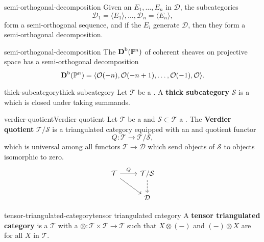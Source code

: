 \begin{example}{semi-orthogonal-decomposition}
    Given an  $E_1, \ldots, E_n$ in $\mathcal{D}$, the subcategories
    \[ \mathcal{D}_1 = \langle E_1 \rangle, \ldots, \mathcal{D}_n = \langle E_n \rangle , \]
    form a semi-orthogonal sequence, and if the $E_i$ generate $\mathcal{D}$, then they form a semi-orthogonal decomposition.
\end{example}

\begin{example}{semi-orthogonal-decomposition}
    The  $\textbf{D}^\textup{b}(\mathbb{P}^n)$ of coherent sheaves on projective space has a semi-orthogonal decomposition
    \[ \textbf{D}^\textup{b}(\mathbb{P}^n) = \langle \mathcal{O}(-n), \mathcal{O}(-n + 1), \ldots, \mathcal{O}(-1), \mathcal{O} \rangle . \]
\end{example}

\begin{topic}{thick-subcategory}{thick subcategory}
    Let $\mathcal{T}$ be a . A \textbf{thick subcategory} $\mathcal{S}$ is a   which is closed under taking summands.
\end{topic}

\begin{topic}{verdier-quotient}{Verdier quotient}
    Let $\mathcal{T}$ be a  and $\mathcal{S} \subset \mathcal{T}$ a . The \textbf{Verdier quotient} $\mathcal{T}/\mathcal{S}$ is a triangulated category equipped with an  and  quotient functor
    \[ Q : \mathcal{T} \to \mathcal{T}/\mathcal{S} , \]
    which is universal among all functors $\mathcal{T} \to \mathcal{D}$ which send objects of $\mathcal{S}$ to objects isomorphic to zero.
    \[ \begin{tikzcd} \mathcal{T} \arrow{r}{Q} \arrow{rd} & \mathcal{T} / \mathcal{S} \arrow[dashed]{d} \\ & \mathcal{D} \end{tikzcd} \]
\end{topic}

\begin{topic}{tensor-triangulated-category}{tensor triangulated category}
    A \textbf{tensor triangulated category} is a  $\mathcal{T}$ with a  $\otimes : \mathcal{T} \times \mathcal{T} \to \mathcal{T}$ such that $X \otimes (-)$ and $(-) \otimes X$ are  for all $X$ in $\mathcal{T}$.
\end{topic}
